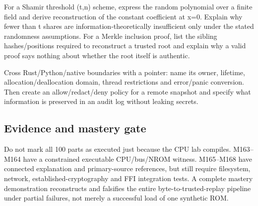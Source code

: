 For a Shamir threshold (t,n) scheme, express the random polynomial over a finite field and derive reconstruction of the constant coefficient at x=0. Explain why fewer than t shares are information-theoretically insufficient only under the stated randomness assumptions. For a Merkle inclusion proof, list the sibling hashes/positions required to reconstruct a trusted root and explain why a valid proof says nothing about whether the root itself is authentic.

Cross Rust/Python/native boundaries with a pointer: name its owner, lifetime, allocation/deallocation domain, thread restrictions and error/panic conversion. Then create an allow/redact/deny policy for a remote snapshot and specify what information is preserved in an audit log without leaking secrets.

\subsection{Evidence and mastery gate}\label{appendix-11f73b337e37-evidence-and-mastery-gate}

\hypertarget{appendix-11f73b337e37-evidence-and-mastery-gate}{}

Do not mark all 100 parts as executed just because the CPU lab compiles. M163--M164 have a constrained executable CPU/bus/NROM witness. M165--M168 have connected explanation and primary-source references, but still require filesystem, network, established-cryptography and FFI integration tests. A complete mastery demonstration reconstructs and falsifies the entire byte-to-trusted-replay pipeline under partial failures, not merely a successful load of one synthetic ROM.
